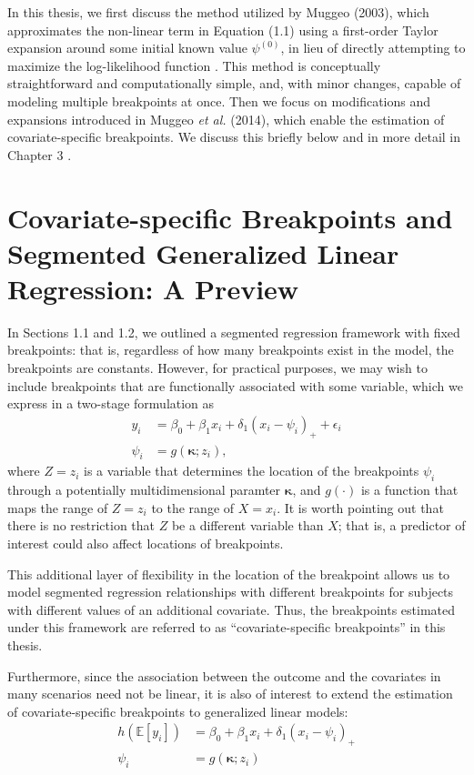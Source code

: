 \documentclass [12pt, proquest] {uwthesis}[2016/11/22]
\begin{document}
In this thesis, we first discuss the method utilized by Muggeo (2003), which approximates the non-linear term in Equation (1.1) using a first-order Taylor expansion around some initial known value $\psi^{(0)}$, in lieu of directly attempting to maximize the log-likelihood function \cite{VM2003}. This method is conceptually straightforward and computationally simple, and, with minor changes, capable of modeling multiple breakpoints at once. Then we focus on modifications and expansions introduced in Muggeo \textit{et al.} (2014), which enable the estimation of covariate-specific breakpoints. We discuss this briefly below and in more detail in Chapter 3 \cite{VM2014}.
 
\section{Covariate-specific Breakpoints and Segmented Generalized Linear Regression: A Preview}
 
In Sections 1.1 and 1.2, we outlined a segmented regression framework with fixed breakpoints: that is, regardless of how many breakpoints exist in the model, the breakpoints are constants. However, for practical purposes, we may wish to include breakpoints that are functionally associated with some variable, which we express in a two-stage formulation as
\begin{align}
    y_i &= \beta_0 + \beta_1 x_i + \delta_1 (x_i - \psi_i)_+ + \epsilon_i \\
    \psi_i &= g(\bm{\kappa}; z_i),
\end{align}
where $Z = z_i$ is a variable that determines the location of the breakpoints $\psi_i$ through a potentially multidimensional paramter $\bm{\kappa}$, and $g(\cdot)$ is a function that maps the range of $Z = z_i$ to the range of $X = x_i$. It is worth pointing out that there is no restriction that $Z$ be a different variable than $X$; that is, a predictor of interest could also affect locations of breakpoints.

This additional layer of flexibility in the location of the breakpoint allows us to model segmented regression relationships with different breakpoints for subjects with different values of an additional covariate. Thus, the breakpoints estimated under this framework are referred to as ``covariate-specific breakpoints'' in this thesis. 

Furthermore, since the association between the outcome and the covariates in many scenarios need not be linear, it is also of interest to extend the estimation of covariate-specific breakpoints to generalized linear models:
\begin{align}
    h(\mathbb{E}[y_i]) &= \beta_0 + \beta_1 x_i + \delta_1 (x_i - \psi_i)_+ \\
    \psi_i &= g(\bm{\kappa}; z_i)
\end{align}
\end{document}
